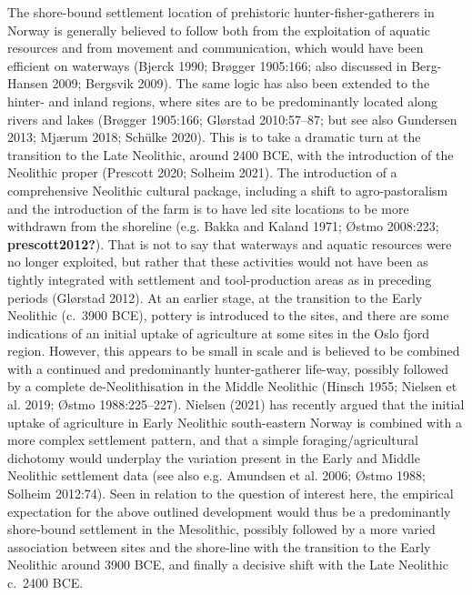 \documentclass[
]{article}
\begin{document}
The shore-bound settlement location of prehistoric hunter-fisher-gatherers in Norway is generally believed to follow both from the exploitation of aquatic resources and from movement and communication, which would have been efficient on waterways (Bjerck 1990; Brøgger 1905:166; also discussed in Berg-Hansen 2009; Bergsvik 2009). The same logic has also been extended to the hinter- and inland regions, where sites are to be predominantly located along rivers and lakes (Brøgger 1905:166; Glørstad 2010:57--87; but see also Gundersen 2013; Mjærum 2018; Schülke 2020). This is to take a dramatic turn at the transition to the Late Neolithic, around 2400 BCE, with the introduction of the Neolithic proper (Prescott 2020; Solheim 2021). The introduction of a comprehensive Neolithic cultural package, including a shift to agro-pastoralism and the introduction of the farm is to have led site locations to be more withdrawn from the shoreline (e.g. Bakka and Kaland 1971; Østmo 2008:223; \textbf{prescott2012?}). That is not to say that waterways and aquatic resources were no longer exploited, but rather that these activities would not have been as tightly integrated with settlement and tool-production areas as in preceding periods (Glørstad 2012). At an earlier stage, at the transition to the Early Neolithic (c.~3900 BCE), pottery is introduced to the sites, and there are some indications of an initial uptake of agriculture at some sites in the Oslo fjord region. However, this appears to be small in scale and is believed to be combined with a continued and predominantly hunter-gatherer life-way, possibly followed by a complete de-Neolithisation in the Middle Neolithic (Hinsch 1955; Nielsen et al. 2019; Østmo 1988:225--227). Nielsen (2021) has recently argued that the initial uptake of agriculture in Early Neolithic south-eastern Norway is combined with a more complex settlement pattern, and that a simple foraging/agricultural dichotomy would underplay the variation present in the Early and Middle Neolithic settlement data (see also e.g. Amundsen et al. 2006; Østmo 1988; Solheim 2012:74). Seen in relation to the question of interest here, the empirical expectation for the above outlined development would thus be a predominantly shore-bound settlement in the Mesolithic, possibly followed by a more varied association between sites and the shore-line with the transition to the Early Neolithic around 3900 BCE, and finally a decisive shift with the Late Neolithic c.~2400 BCE.
\end{document}
